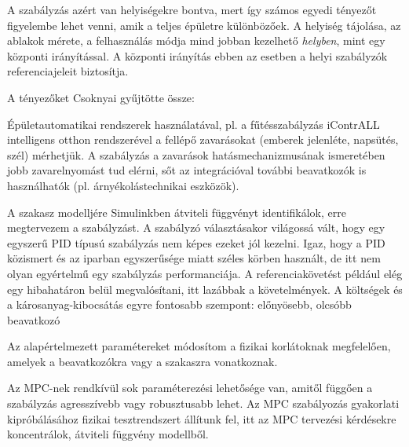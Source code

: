 A szabályzás azért van helyiségekre bontva, mert így számos egyedi tényezőt figyelembe lehet venni, amik a teljes épületre különbözőek. A helyiség tájolása, az ablakok mérete, a felhasználás módja mind jobban kezelhető \textit{helyben}, mint egy központi irányítással. A központi irányítás ebben az esetben a helyi szabályzók referenciajeleit biztosítja.

A tényezőket Csoknyai \cite{Herz} gyűjtötte össze:





Épületautomatikai rendszerek használatával, pl. a fűtésszabályzás iContrALL intelligens otthon rendszerével a fellépő zavarásokat (emberek jelenléte, napsütés, szél) mérhetjük. A szabályzás a zavarások hatásmechanizmusának ismeretében jobb zavarelnyomást tud elérni, sőt az integrációval további beavatkozók is használhatók (pl. árnyékolástechnikai eszközök).




A szakasz modelljére Simulinkben átviteli függvényt identifikálok, erre megtervezem a szabályzást. A szabályzó választásakor világossá vált, hogy egy egyszerű PID típusú szabályzás nem képes ezeket jól kezelni. Igaz, hogy a PID közismert és az iparban egyszerűsége miatt széles körben használt, de itt nem olyan egyértelmű egy szabályzás performanciája. A referenciakövetést például elég egy hibahatáron belül megvalósítani, itt lazábbak a követelmények.
A költségek és a károsanyag-kibocsátás egyre fontosabb szempont: előnyösebb, olcsóbb beavatkozó 




Az alapértelmezett paramétereket módosítom a fizikai korlátoknak megfelelően,  amelyek a beavatkozókra vagy a szakaszra vonatkoznak.

Az MPC-nek rendkívül sok paraméterezési lehetősége van, amitől függően a szabályzás agresszívebb vagy robusztusabb lehet.   %
Az MPC szabályozás gyakorlati kipróbálásához fizikai tesztrendszert állítunk fel, itt az MPC tervezési kérdésekre koncentrálok, átviteli függvény modellből.






